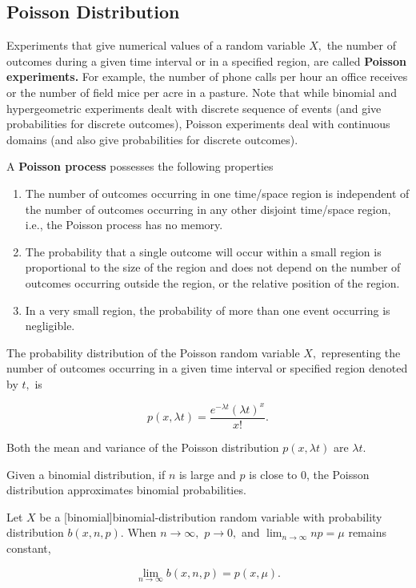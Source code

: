 \documentclass{article}
\begin{document}
\subsection{Poisson Distribution}

\begin{definition}
Experiments that give numerical values of a \@{random variable} $X,$ the number of outcomes during a given time interval or in a specified region, are called \textbf{Poisson experiments.} For example, the number of phone calls per hour an office receives or the number of field mice per acre in a pasture. Note that while binomial and hypergeometric experiments dealt with discrete \@{sequence} of \@{events} (and give \@{probabilities} for discrete outcomes), Poisson experiments deal with continuous domains (and also give probabilities for discrete outcomes).

A \textbf{Poisson process} possesses the following properties

\begin{enumerate}
\item The number of outcomes occurring in one time/space region is \@{independent} of the number of outcomes occurring in any other disjoint time/space region, i.e., the Poisson process has no memory.
\item The probability that a single outcome will occur within a small region is proportional to the size of the region and does not depend on the number of outcomes occurring outside the region, or the relative position of the region.
\item In a very small region, the probability of more than one event occurring is negligible.
\end{enumerate}

The \@{probability distribution} of the Poisson random variable $X,$ representing the number of outcomes occurring in a given time interval or specified region denoted by $t,$ is

\[ p(x, \lambda t) = \frac{e^{-\lambda t}(\lambda t)^x}{x!}. \]

Both the mean and \@{variance} of the Poisson distribution $p(x, \lambda t)$ are $\lambda t.$
\end{definition}

Given a \@{binomial distribution}, if $n$ is large and $p$ is close to 0, the \@{Poisson distribution} approximates binomial \@{probabilities}.

\begin{theorem}\label{poisson-approximation-binomial}
Let $X$ be a \@[binomial]{binomial-distribution} \@{random variable} with \@{probability distribution} $b(x, n, p).$ When $n \to \infty,$ $p \to 0,$ and $\lim_{n \to \infty}{np} = \mu$ remains constant,

\[ \lim_{n \to \infty}{b(x, n, p)} = p(x, \mu). \]
\end{theorem}
\end{document}
